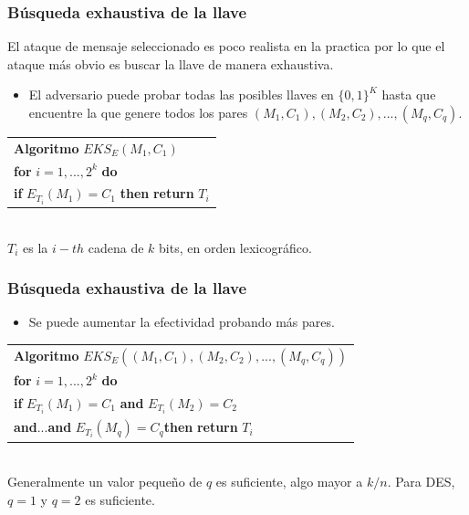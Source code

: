 \documentclass{beamer}
\newcommand{\binStr}{\{0,1\}}
\newcommand{\tab}{\hspace{0.5cm}}
\begin{document}
\frame
{
	\frametitle{Búsqueda exhaustiva de la llave}

	El ataque de mensaje seleccionado es poco realista en la practica por lo que el ataque más obvio es buscar la llave de manera exhaustiva. 
	
	\begin{itemize}
	\item El adversario puede probar todas las posibles llaves en $\binStr^K$ hasta que encuentre la que genere todos los pares $(M_1,C_1),(M_2,C_2),...,(M_q,C_q)$.
	\end{itemize}
\vspace{0.5cm}

	 \begin{tabular}{l}
	 \textbf{Algoritmo} $EKS_E(M_1,C_1)$\\
	 \tab\textbf{for} $i=1,...,2^k$ \textbf{do}\\
	 \tab\tab \textbf{if} $E_{T_i}(M_1)=C_1$ \textbf{then} \textbf{return} $T_i$\\
	 \end{tabular}\\
\vspace{0.5cm}
{\color{red}$T_i$ es la $i-th$ cadena de $k$ bits, en orden lexicográfico.}
}

\frame
{
	\frametitle{Búsqueda exhaustiva de la llave}


	\begin{itemize}
	\item Se puede aumentar la efectividad probando más pares.
	\end{itemize}
\vspace{0.5cm}

	 \begin{tabular}{l}
	 \textbf{Algoritmo} $EKS_E((M_1,C_1),(M_2,C_2),...,(M_q,C_q))$\\
	 \tab\textbf{for} $i=1,...,2^k$ \textbf{do}\\
	 \tab\tab \textbf{if} $E_{T_i}(M_1)=C_1$ \textbf{and} $E_{T_i}(M_2)=C_2$ \\ \tab\tab\textbf{and}...\textbf{and} $E_{T_i}(M_q)=C_q$\textbf{then} \textbf{return} $T_i$\\
	 \end{tabular}\\
\vspace{0.5cm}
{\color{red}Generalmente un valor pequeño de $q$ es suficiente, algo mayor a $k/n$. Para DES, $q=1$ y $q=2$ es suficiente.}
}
\end{document}
